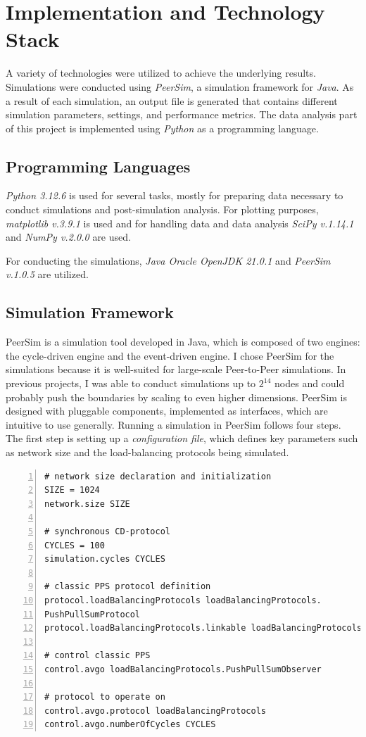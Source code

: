 \chapter{Implementation and Technology Stack}\label{chap:implementation}
A variety of technologies were utilized to achieve the underlying results. Simulations were conducted using \textit{PeerSim}, a simulation framework for \textit{Java}. As a result of each simulation, an output file is generated that contains different simulation parameters, settings, and performance metrics. The data analysis part of this project is implemented using \textit{Python} as a programming language.

\section{Programming Languages}\label{sec:proglangs}
\textit{Python 3.12.6} is used for several tasks, mostly for preparing data necessary to conduct simulations and post-simulation analysis. For plotting purposes, \textit{matplotlib v.3.9.1} is used and for handling data and data analysis \textit{SciPy v.1.14.1} and \textit{NumPy v.2.0.0} are used.

For conducting the simulations, \textit{Java Oracle OpenJDK 21.0.1} and \textit{PeerSim v.1.0.5} are utilized.

\section{Simulation Framework}\label{sec:simulationframework}
PeerSim is a simulation tool developed in Java, which is composed of two engines: the cycle-driven engine and the event-driven engine. I chose PeerSim for the simulations because it is well-suited for large-scale Peer-to-Peer simulations. In previous projects, I was able to conduct simulations up to $2^{14}$ nodes and could probably push the boundaries by scaling to even higher dimensions. PeerSim is designed with pluggable components, implemented as interfaces, which are intuitive to use generally. Running a simulation in PeerSim follows four steps. The first step is setting up a \textit{configuration file}, which defines key parameters such as network size and the load-balancing protocols being simulated.

\begin{lstlisting}[caption=Example configuration, captionpos=b, numbers=left, label=lst:exampleConfig]
# network size declaration and initialization
SIZE = 1024
network.size SIZE

# synchronous CD-protocol
CYCLES = 100
simulation.cycles CYCLES

# classic PPS protocol definition
protocol.loadBalancingProtocols loadBalancingProtocols.
PushPullSumProtocol
protocol.loadBalancingProtocols.linkable loadBalancingProtocols

# control classic PPS
control.avgo loadBalancingProtocols.PushPullSumObserver

# protocol to operate on
control.avgo.protocol loadBalancingProtocols
control.avgo.numberOfCycles CYCLES
\end{lstlisting}


